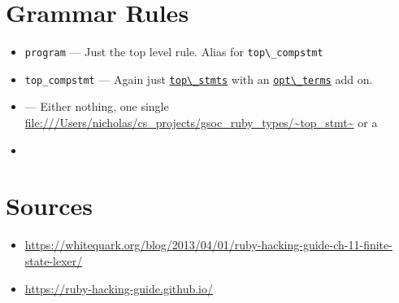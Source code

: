 \documentclass[11pt]{article}
\begin{document}
\section{Grammar Rules}
\label{sec-7}
\begin{itemize}
\item \verb~program~ --- Just the top level rule. Alias for \texttt{\verb~top\_compstmt~}
\item \label{top_compstmt} \verb~top_compstmt~ --- Again just \hyperref[top_stmts]{\verb~top\_stmts~} with an
\hyperref[opt_terms]{\verb~opt\_terms~} add on.
\item \label{top_stmts} --- Either nothing, one single \url{file:///Users/nicholas/cs_projects/gsoc_ruby_types/~top_stmt~} or a
\item \label{opt_terms}
\end{itemize}

\section{Sources}
\label{sec-8}

\begin{itemize}
\item \url{https://whitequark.org/blog/2013/04/01/ruby-hacking-guide-ch-11-finite-state-lexer/}
\item \url{https://ruby-hacking-guide.github.io/}
\end{itemize}
\end{document}
